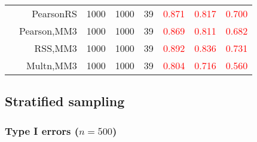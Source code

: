 \documentclass[
]{article}
\begin{document}
\begin{table}[H]
{\begin{tabular}[t]{lrrrrrrr}
\hspace{1em} & PearsonRS & 1000 & 1000 & 39 & \textcolor{red}{0.871} & \textcolor{red}{0.817} & \textcolor{red}{0.700}\\

\hspace{1em} & Pearson,MM3 & 1000 & 1000 & 39 & \textcolor{red}{0.869} & \textcolor{red}{0.811} & \textcolor{red}{0.682}\\

\hspace{1em} & RSS,MM3 & 1000 & 1000 & 39 & \textcolor{red}{0.892} & \textcolor{red}{0.836} & \textcolor{red}{0.731}\\

\hspace{1em} & Multn,MM3 & 1000 & 1000 & 39 & \textcolor{red}{0.804} & \textcolor{red}{0.716} & \textcolor{red}{0.560}\\
\bottomrule
\end{tabular}}
\endgroup{}
\end{table}

\hypertarget{stratified-sampling}{%
\subsection{Stratified sampling}\label{stratified-sampling}}

\hypertarget{type-i-errors-n500-1}{%
\subsubsection{\texorpdfstring{Type I errors
(\(n=500\))}{Type I errors (n=500)}}\label{type-i-errors-n500-1}}
\end{document}
